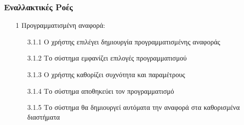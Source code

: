 \documentclass[12pt,a4paper,twoside]{book}
\begin{document}
\subsubsection{Εναλλακτικές Ροές}
\begin{enumerate}
  \item[1 ] Προγραμματισμένη αναφορά:
        \begin{enumerate}
          \item[3.1.1 ] Ο χρήστης επιλέγει δημιουργία προγραμματισμένης αναφοράς
          \item[3.1.2 ] Το σύστημα εμφανίζει επιλογές προγραμματισμού
          \item[3.1.3 ] Ο χρήστης καθορίζει συχνότητα και παραμέτρους
          \item[3.1.4 ] Το σύστημα αποθηκεύει τον προγραμματισμό
          \item[3.1.5 ] Το σύστημα θα δημιουργεί αυτόματα την αναφορά στα καθορισμένα διαστήματα
        \end{enumerate}

\end{enumerate}
\end{document}
